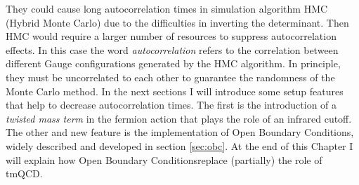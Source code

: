 \documentclass[english, LaM, oneside, noexaminfo]{sapthesis}
\newcommand{\obc}{Open Boundary Conditions}
\begin{document}
They could cause long autocorrelation times in simulation algorithm HMC (Hybrid Monte Carlo) due to the difficulties in inverting the determinant.
Then HMC would require a larger number of resources to suppress autocorrelation effects.
In this case the word {\it autocorrelation} refers to the correlation between different Gauge configurations generated by the HMC algorithm.
In principle, they must be uncorrelated to each other to guarantee the randomness of the Monte Carlo method.
\newline
In the next sections I will introduce some setup features that help to decrease autocorrelation times.
The first is the introduction of a {\it twisted mass term} in the fermion action that plays the role of an infrared cutoff.
The other and new feature is the implementation of \obc, widely described and developed in section \ref{sec:obc}.
At the end of this Chapter I will explain how \obc\space replace (partially) the role of tmQCD.
\end{document}

